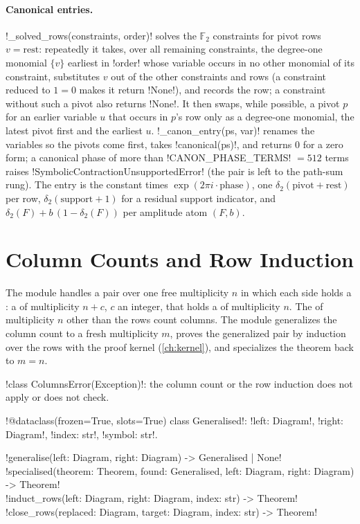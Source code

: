 \paragraph{Canonical entries.} \py!_solved_rows(constraints, order)! solves the $\mathbb F_2$ constraints for pivot rows $v=\text{rest}$: repeatedly it takes, over all remaining constraints, the degree-one monomial $\{v\}$ earliest in \py!order! whose variable occurs in no other monomial of its constraint, substitutes $v$ out of the other constraints and rows (a constraint reduced to $1=0$ makes it return \py!None!), and records the row; a constraint without such a pivot also returns \py!None!. It then swaps, while possible, a pivot $p$ for an earlier variable $u$ that occurs in $p$'s row only as a degree-one monomial, the latest pivot first and the earliest $u$. \py!_canon_entry(ps, var)! renames the variables so the pivots come first, takes \py!canonical(ps)!, and returns $0$ for a zero form; a canonical phase of more than \py!CANON_PHASE_TERMS! $=512$ terms raises \py!SymbolicContractionUnsupportedError! (the pair is left to the path-sum rung). The entry is the constant times $\exp(2\pi i\cdot\text{phase})$, one $\delta_2(\text{pivot}+\text{rest})$ per row, $\delta_2(\text{support}+1)$ for a residual support indicator, and $\delta_2(F)+b\,(1-\delta_2(F))$ per amplitude atom $(F,b)$.

\section{Column Counts and Row Induction}\label{sec:semantics-columns}

The module  handles a pair over one free multiplicity $n$ in which each side holds a : a \bbox{} of multiplicity $n+c$, $c$ an integer, that holds a \bbox{} of multiplicity $n$. The \bboxes{} of multiplicity $n$ other than the rows \bbox{} count columns. The module generalizes the column count to a fresh multiplicity $m$, proves the generalized pair by induction over the rows with the proof kernel (\cref{ch:kernel}), and specializes the theorem back to $m=n$.

\begin{signature}
\py!class ColumnsError(Exception)!: the column count or the row induction does not apply or does not check.

\py!@dataclass(frozen=True, slots=True) class Generalised!: \py!left: Diagram!, \py!right: Diagram!, \py!index: str!, \py!symbol: str!.

\py!generalise(left: Diagram, right: Diagram) -> Generalised | None!\\
\py!specialised(theorem: Theorem, found: Generalised, left: Diagram, right: Diagram) -> Theorem!\\
\py!induct_rows(left: Diagram, right: Diagram, index: str) -> Theorem!\\
\py!close_rows(replaced: Diagram, target: Diagram, index: str) -> Theorem!
\end{signature}


